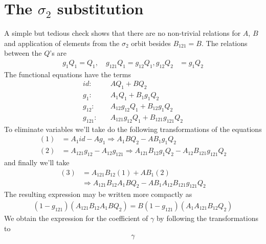 \section{The $\sigma_2$ substitution}
A simple but tedious check shows that there are no non-trivial relations for $A$, $B$ and application of elements from the $\sigma_2$ orbit besides $B_{121} = B$. The relations between the $Q$'s are
\begin{align}
	g_{1}Q_1 =  Q_1,\quad g_{121} Q_1= g_{12} Q_1, g_{12} Q_2 &= g_1Q_2
\end{align}
The functional equations have the terms
\begin{align}
	id:&\quad AQ_1+BQ_2 \\
	g_1:&\quad A_1 Q_1 + B_1 g_1 Q_2\\
	g_{12}:&\quad A_{12}g_{12}Q_1 + B_{12}g_{1}Q_2 \\
	g_{121}:&\quad A_{121} g_{12}Q_1 + B_{121} g_{121}Q_2
\end{align}
To eliminate variables we'll take do the following transformations of the equations
\begin{align}
	(1) &= A_1 id - A g_1 \Longrightarrow A_1B Q_2 - A B_1 g_1 Q_2\\
	(2) &= A_{121} g_{12} - A_{12} g_{121} \Longrightarrow A_{121}B_{12} g_1 Q_2 - A_{12} B_{121} g_{121} Q_2
\end{align}
and finally we'll take
\begin{align}
	(3) &= A_{121}B_{12}(1) + A B_1 (2)\\
	&\Longrightarrow A_{121}B_{12}A_1 B Q_2 - A B_1 A_{12} B_{121} g_{121} Q_2
\end{align}
The resulting expression may be written more compactly as
\begin{align}
	(1-g_{121})(A_{121}B_{12}A_1 B Q_2) = B(1-g_{121})(A_1A_{121}B_{12}Q_2)
\end{align}
We obtain the expression for the coefficient of $\gamma$ by following the transformations to
\begin{align}
	[A_{121}B_{12}(A_1 - A)+A B_1(A_{121} - A_{12})]\gamma
\end{align}

